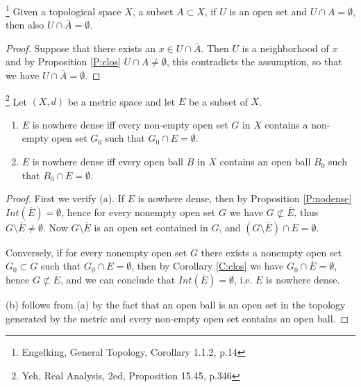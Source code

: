 \begin{corollary} \label{C:clos}
\footnote{Engelking, General Topology, Corollary 1.1.2, p.14}
Given a topological space $X$, a subset $A\subset X$, if $U$ is an open set and
$U\cap A=\emptyset$, then also $U\cap \overline{A}=\emptyset$.
\end{corollary}
\begin{proof}
Suppose that there exists an $x\in U\cap\overline{A}$. Then $U$ is a
neighborhood of $x$ and by Proposition \ref{P:clos} $U\cap A\neq \emptyset$,
this contradicts the assumption, so that we have $U\cap \overline{A}=\emptyset$.
\end{proof}

\begin{proposition} \label{P:nondense}
\footnote{Yeh, Real Analysis, 2ed, Proposition 15.45, p.346}
Let $(X,d)$ be a metric space and let $E$ be a subset of $X$.
\begin{enumerate}
  \item[(a)] $E$ is nowhere dense iff every non-empty open set $G$ in $X$
		contains a non-empty open set $G_0$ such that $G_0\cap E=\emptyset$.
  \item[(b)] $E$ is nowhere dense iff every open ball $B$ in $X$
		contains an open ball $B_0$ such that $B_0\cap E=\emptyset$.
\end{enumerate}
\end{proposition}
\begin{proof}
First we verify (a). If $E$ is nowhere dense, then by Proposition 
\ref{P:nodense} $Int(\overline{E})=\emptyset$, hence for every nonempty open 
set $G$ we have $G\nsubset \overline{E}$, thus 
$G\setminus \overline{E}\neq\emptyset$. Now
$G\setminus \overline{E}$ is an open set contained in $G$, and 
$(G\setminus \overline{E})\cap E=\emptyset$. 

Conversely, if for every nonempty open set $G$ there exists a nonempty open set
$G_0\subset G$ such that $G_0\cap E=\emptyset$, then by Corollary \ref{C:clos}
we have $G_0\cap \overline{E}=\emptyset$, hence $G\nsubset\overline{E}$, and we
can conclude that $Int(\overline{E})=\emptyset$, i.e. $E$ is nowhere dense.

(b) follows from (a) by the fact that an open ball is an open set in the
topology generated by the metric and every non-empty open set contains an open
ball.
\end{proof}

